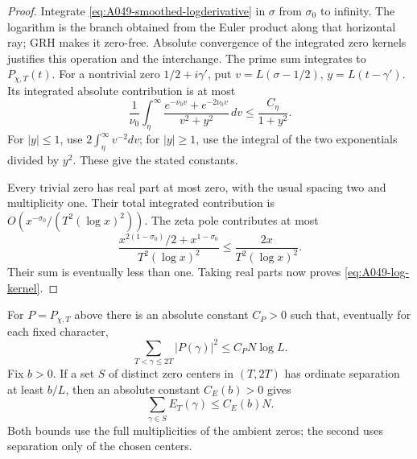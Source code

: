 \begin{proof}
Integrate \eqref{eq:A049-smoothed-logderivative} in \(\sigma\)
from \(\sigma_0\) to infinity. The logarithm is the branch
obtained from the Euler product along that horizontal ray;
GRH makes it zero-free. Absolute convergence of the integrated
zero kernels justifies this operation and the interchange.
The prime sum integrates to \(P_{\chi,T}(t)\).
For a nontrivial zero \(1/2+i\gamma'\), put
\(v=L(\sigma-1/2)\), \(y=L(t-\gamma')\). Its integrated
absolute contribution is at most
\[
 \frac1{\nu_0}\int_\eta^\infty
       \frac{e^{-\nu_0v}+e^{-2\nu_0v}}{v^2+y^2}\,dv
                    \le\frac{C_\eta}{1+y^2}.
\]
For \(|y|\le1\), use \(2\int_\eta^\infty v^{-2}dv\);
for \(|y|\ge1\), use the integral of the two exponentials
divided by \(y^2\). These give the stated constants.

Every trivial zero has real part at most zero, with the
usual spacing two and multiplicity one. Their total
integrated contribution is
\(O(x^{-\sigma_0}/(T^2(\log x)^2))\).
The zeta pole contributes at most
\[
 \frac{x^{2(1-\sigma_0)}/2+x^{1-\sigma_0}}
                         {T^2(\log x)^2}
                 \le\frac{2x}{T^2(\log x)^2}.
\]
Their sum is eventually less than one. Taking real parts
now proves \eqref{eq:A049-log-kernel}.
\end{proof}

\begin{lemma}
\label{lem:A049-logarithmic-sampling}
For \(P=P_{\chi,T}\) above there is an absolute constant
\(C_P>0\) such that, eventually for each fixed character,
\begin{equation}\label{eq:A049-prime-square}
                  \sum_{T<\gamma\le2T}|P(\gamma)|^2
                                      \le C_P N\log L.
\end{equation}
Fix \(b>0\). If a set \(S\) of distinct zero centers in
\((T,2T)\) has ordinate separation at least \(b/L\),
then an absolute constant \(C_E(b)>0\) gives
\begin{equation}\label{eq:A049-reversed-kernel}
                         \sum_{\gamma\in S}E_T(\gamma)
                                              \le C_E(b)N.
\end{equation}
Both bounds use the full multiplicities of the ambient zeros;
the second uses separation only of the chosen centers.
\end{lemma}

